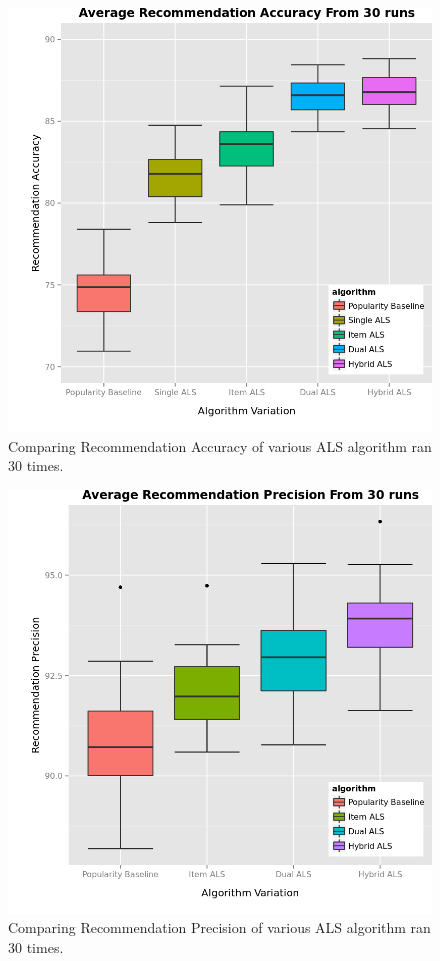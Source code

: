 \begin{figure}
\centering
\includegraphics[scale=0.7]{recent_images/accuracy.png}
\caption{Comparing Recommendation Accuracy of various ALS algorithm ran 30 times.}
\label{fig:algorithms}
\end{figure}

\begin{figure}
\centering
\includegraphics[scale=0.7]{recent_images/precision.png}
\caption{Comparing Recommendation Precision of various ALS algorithm ran 30 times.}
\label{fig:algorithms}
\end{figure}

